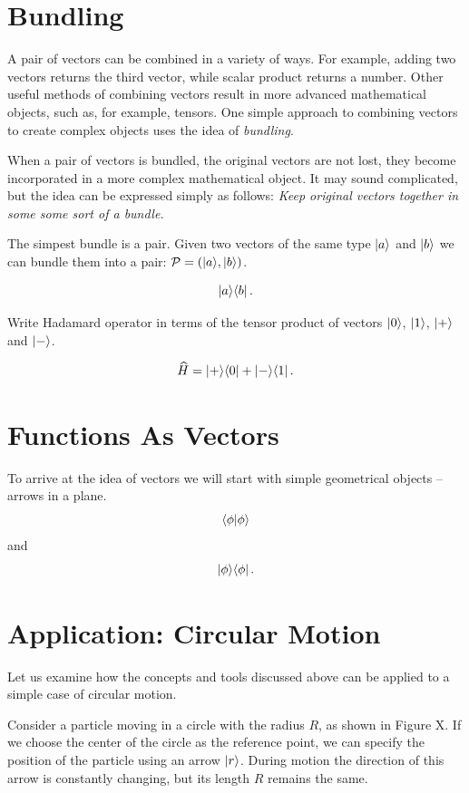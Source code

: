 \section{Bundling}
A pair of vectors can be combined in a variety of ways. For example, adding two vectors returns the third vector, while scalar product returns a number. Other useful methods of combining vectors result in more advanced mathematical objects, such as, for example, tensors. One simple approach to combining vectors to create complex objects uses the idea of \emph{bundling}.

When a pair of vectors is bundled, the original vectors are not lost, they become incorporated in a more complex mathematical object. It may sound complicated, but the idea can be expressed simply as follows: \emph{Keep original vectors together in some some sort of a bundle.}

The simpest bundle is a pair. Given two vectors of the same type $|{a}\rangle$ and $|{b}\rangle$ we can bundle them into a pair: $\mathcal{P}=(|{a}\rangle, |{b}\rangle)$.

\[
|{a}\rangle\langle{b}|\,.
\]
\begin{exercise}
	Write Hadamard operator in terms of the tensor product of vectors $|{0}\rangle$, $|{1}\rangle$, $|{+}\rangle$ and $|{-}\rangle$.
	
	\[
	\widehat{H} = |{+}\rangle\langle{0}|+|{-}\rangle\langle{1}|\,.
	\]
\end{exercise}

\section{Functions As Vectors}

To arrive at the idea of vectors we will start with simple geometrical
objects -- arrows in a plane.
\[
\langle{\phi}|{\phi\rangle}
\]
and
\[
|{\phi}\rangle\langle{\phi}|\,.
\]

\section{Application: Circular Motion}
Let us examine how the concepts and tools discussed above can be applied to a simple case of circular motion.  

Consider a  particle moving in a circle with the radius $R$, as shown in Figure X. If we choose the center of the circle as the reference point, we can specify the position of the particle using an arrow $|{r}\rangle$. During motion the direction of this arrow is constantly changing, but its length $R$ remains the same.  

